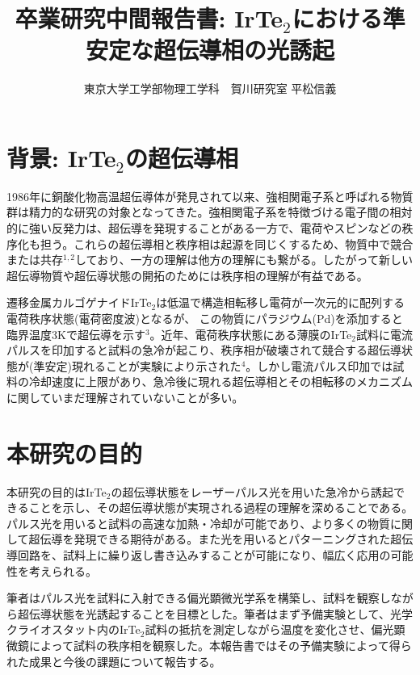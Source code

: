 \documentclass[11pt,a4paper]{jsarticle}
\title{\vspace{-1.5zh}卒業研究中間報告書: IrTe$_2$における準安定な超伝導相の光誘起}
\author{\vspace{-2zh}東京大学工学部物理工学科　賀川研究室 平松信義}
\date{}
\begin{document}
\maketitle
\thispagestyle{mypagestyle}

\vspace{-2zh}
\section{背景: IrTe$_2$の超伝導相}
1986年に銅酸化物高温超伝導体が発見されて以来、強相関電子系と呼ばれる物質群は精力的な研究の対象となってきた。強相関電子系を特徴づける電子間の相対的に強い反発力は、超伝導を発現することがある一方で、電荷やスピンなどの秩序化も担う。これらの超伝導相と秩序相は起源を同じくするため、物質中で競合または共存$^{1,2}$しており、一方の理解は他方の理解にも繋がる。したがって新しい超伝導物質や超伝導状態の開拓のためには秩序相の理解が有益である。

遷移金属カルゴゲナイドIrTe$_2$は低温で構造相転移し電荷が一次元的に配列する電荷秩序状態(電荷密度波)となるが、
この物質にパラジウム(Pd)を添加すると臨界温度3Kで超伝導を示す$^3$。近年、電荷秩序状態にある薄膜のIrTe$_2$試料に電流パルスを印加すると試料の急冷が起こり、秩序相が破壊されて競合する超伝導状態が(準安定)現れることが実験により示された$^4$。しかし電流パルス印加では試料の冷却速度に上限があり、急冷後に現れる超伝導相とその相転移のメカニズムに関していまだ理解されていないことが多い。

\section{本研究の目的}
本研究の目的はIrTe$_2$の超伝導状態をレーザーパルス光を用いた急冷から誘起できることを示し、その超伝導状態が実現される過程の理解を深めることである。パルス光を用いると試料の高速な加熱・冷却が可能であり、より多くの物質に関して超伝導を発現できる期待がある。また光を用いるとパターニングされた超伝導回路を、試料上に繰り返し書き込みすることが可能になり、幅広く応用の可能性を考えられる。

筆者はパルス光を試料に入射できる偏光顕微光学系を構築し、試料を観察しながら超伝導状態を光誘起することを目標とした。筆者はまず予備実験として、光学クライオスタット内のIrTe$_2$試料の抵抗を測定しながら温度を変化させ、偏光顕微鏡によって試料の秩序相を観察した。本報告書ではその予備実験によって得られた成果と今後の課題について報告する。
\end{document}
